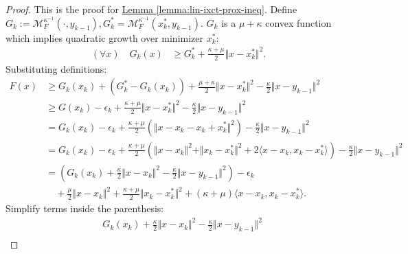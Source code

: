 \documentclass[12pt]{article}
\begin{document}
        \begin{proof}
            This is the proof for 
            \hyperref[lemma:lin-ixct-prox-ineq]{Lemma \ref*{lemma:lin-ixct-prox-ineq}}.   
            Define $G_k := \mathcal M_F^{\kappa^{-1}}(\cdot, y_{k - 1}), G_k^* = \mathcal M_F^{\kappa^{-1}}(x_k^*, y_{k - 1})$. 
        $G_k$ is a $\mu + \kappa$ convex function which implies quadratic growth over minimizer $x_k^*$: 
        \begin{align*}
            (\forall x)\quad G_k(x) &\ge G_k^* + \frac{\kappa + \mu}{2}\Vert x - x_k^*\Vert^2. 
        \end{align*}
        Substituting definitions:
        {\small
        \begin{align*}
            F(x) &\ge 
            G_k(x_k) + (G_k^* - G_k(x_k)) + 
            \frac{\mu + \kappa}{2}\Vert x - x_k^*\Vert^2 
            - \frac{\kappa}{2}\Vert x - y_{k - 1}\Vert^2
            \\
            &\ge 
            G(x_k) - \epsilon_k + \frac{\kappa + \mu}{2}\Vert x - x_k^*\Vert^2
            - \frac{\kappa}{2}\Vert x - y_{k - 1}\Vert^2
            \\
            &= G_k(x_k) - \epsilon_k + \frac{\kappa + \mu}{2}
            \left(
                \Vert x - x_k - x_k + x_k^*\Vert^2
            \right)
            - \frac{\kappa}{2}\Vert x - y_{k - 1}\Vert^2
            \\
            &= G_k(x_k) - \epsilon_k + \frac{\kappa + \mu}{2}
            \left(
                \Vert x - x_k\Vert^2 + \Vert x_k - x_k^*\Vert^2
                + 
                2\langle x - x_k, x_k - x_k^*\rangle
            \right)
            - \frac{\kappa}{2}\Vert x - y_{k - 1}\Vert^2
            \\
            &= 
            \left(
                G_k(x_k) + \frac{\kappa}{2}\Vert x - x_k\Vert^2 - \frac{\kappa}{2}\Vert x - y_{k - 1}\Vert^2
            \right)
            - \epsilon_k
            \\ &\quad 
                + \frac{\mu}{2}\Vert x - x_k\Vert^2
                + \frac{\kappa + \mu}{2}\Vert x_k - x_k^*\Vert^2
                + (\kappa + \mu)\langle x - x_k, x_k - x_k^*\rangle. 
        \end{align*}
        }
        Simplify terms inside the parenthesis: 
        \begin{align*}
            &
            G_k(x_k) 
            + \frac{\kappa}{2}\Vert x - x_k\Vert^2 - \frac{\kappa}{2}\Vert x - y_{k - 1}\Vert^2
            \\

\end{align*}
\end{proof}
\end{document}
